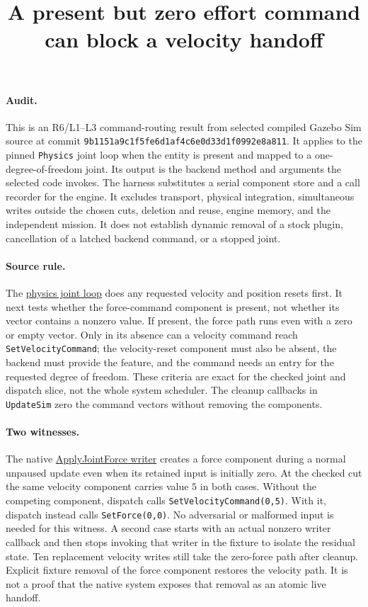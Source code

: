 \documentclass{article}
\title{A present but zero effort command can block a velocity handoff}
\author{}
\date{}
\begin{document}
\maketitle
\paragraph{Audit.}
This is an R6/L1--L3 command-routing result from selected compiled
Gazebo Sim source at commit
\texttt{9b1151a9c1f5fe6d1af4c6e0d33d1f0992e8a811}. It applies to
the pinned \texttt{Physics} joint loop when the entity is present and
mapped to a one-degree-of-freedom joint. Its output is the backend
method and arguments the selected code invokes. The harness substitutes
a serial component store and a call recorder for the engine. It excludes
transport, physical integration, simultaneous writes outside the chosen
cuts, deletion and reuse, engine memory, and the independent mission.
It does not establish dynamic removal of a stock plugin, cancellation
of a latched backend command, or a stopped joint.

\paragraph{Source rule.}
The
\href{https://github.com/gazebosim/gz-sim/blob/9b1151a9c1f5fe6d1af4c6e0d33d1f0992e8a811/src/systems/physics/Physics.cc}{physics joint loop}
does any requested velocity and position resets first. It next tests
whether the force-command component is present, not whether its vector
contains a nonzero value. If present, the force path runs even with a
zero or empty vector. Only in its absence can a velocity command reach
\texttt{SetVelocityCommand}; the velocity-reset component must also
be absent, the backend must provide the feature, and the command
needs an entry for the requested degree of freedom. These criteria
are exact for the checked joint and dispatch slice, not the whole
system scheduler. The cleanup callbacks in \texttt{UpdateSim} zero the
command vectors without removing the components.

\paragraph{Two witnesses.}
The native
\href{https://github.com/gazebosim/gz-sim/blob/9b1151a9c1f5fe6d1af4c6e0d33d1f0992e8a811/src/systems/apply_joint_force/ApplyJointForce.cc}{ApplyJointForce writer}
creates a force component during a normal unpaused update even when
its retained input is initially zero. At the checked cut the same
velocity component carries value $5$ in both cases. Without the
competing component, dispatch calls \texttt{SetVelocityCommand(0,5)}.
With it, dispatch instead calls \texttt{SetForce(0,0)}. No adversarial
or malformed input is needed for this witness. A second case starts with
an actual nonzero writer callback and then stops invoking that writer in
the fixture to isolate the residual state. Ten replacement velocity
writes still take the zero-force path after cleanup. Explicit fixture
removal of the force component restores the velocity path. It is not
a proof that the native system exposes that removal as an atomic live
handoff.
\end{document}
